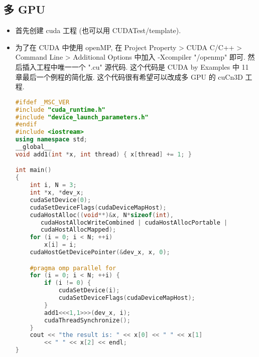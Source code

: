\subsection{多 GPU}
\begin{itemize}
\item 首先创建 cuda 工程 (也可以用 CUDATest/template).
\item 为了在 CUDA 中使用 openMP, 在 Project Property > CUDA C/C++ > Command Line > Additional Options 中加入 -Xcompiler "/openmp" 即可. 然后插入工程中唯一一个 ".cu" 源代码. 这个代码是 CUDA by Examples 中 11 章最后一个例程的简化版. 这个代码很有希望可以改成多 GPU 的 cuCn3D 工程.
\begin{lstlisting}[language=cpp]
#ifdef _MSC_VER
#include "cuda_runtime.h"
#include "device_launch_parameters.h"
#endif
#include <iostream>
using namespace std;
__global__
void add1(int *x, int thread) { x[thread] += 1; }

int main()
{
	int i, N = 3;
	int *x, *dev_x;
	cudaSetDevice(0);
	cudaSetDeviceFlags(cudaDeviceMapHost);
	cudaHostAlloc((void**)&x, N*sizeof(int),
       cudaHostAllocWriteCombined | cudaHostAllocPortable | 
       cudaHostAllocMapped);
	for (i = 0; i < N; ++i)
		x[i] = i;
	cudaHostGetDevicePointer(&dev_x, x, 0);

	#pragma omp parallel for
	for (i = 0; i < N; ++i) {
		if (i != 0) {
			cudaSetDevice(i);
			cudaSetDeviceFlags(cudaDeviceMapHost);
		}
		add1<<<1,1>>>(dev_x, i);
		cudaThreadSynchronize();
	}
	cout << "the result is: " << x[0] << " " << x[1]
        << " " << x[2] << endl;
}
\end{lstlisting}
\end{itemize}
